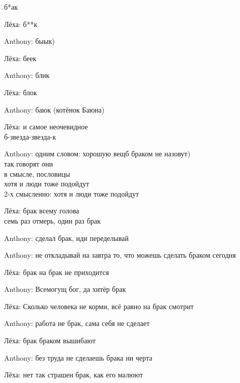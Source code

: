 \begin{flushleft}
\begin{miamalist}
  б*ак

  \item[Лёха:] б**к
  \item[Anthony:] быык)
  \item[Лёха:] беек\\
  \item[Anthony:] блик\\
  \item[Лёха:] блок\\
  \item[Anthony:] баюк (котёнок Баюна) \\
  \item[Лёха:] и самое неочевидное\\
б-звезда-звезда-к\\
  \item[Anthony:] одним словом: хорошую вещб браком не назовут)\\
так говорят они\\
в смысле, пословицы\\
хотя и люди тоже подойдут\\
2-х смысленно: хотя и люди тоже подойдут\\
  \item[Лёха:] брак всему голова\\
семь раз отмерь, один раз брак\\
  \item[Anthony:] сделал брак, иди переделывай\\
  \item[Anthony:] не откладывай на завтра то, что можешь сделать браком сегодня\\
  \item[Лёха:] брак на брак не приходится\\
  \item[Anthony:] Всемогущ бог, да хитёр брак\\
  \item[Лёха:] Сколько человека не корми, всё равно на брак смотрит\\
  \item[Anthony:] работа не брак, сама себя не сделает\\
  \item[Лёха:] брак браком вышибают\\
  \item[Anthony:] без труда не сделаешь брака ни черта\\
  \item[Лёха:] нет так страшен брак, как его малюют\\

\end{miamalist}
\end{flushleft}
